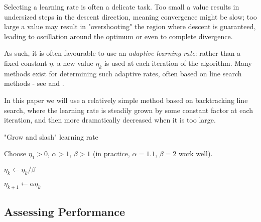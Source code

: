 \documentclass{article}[11pt]
\begin{document}
            Selecting a learning rate is often a delicate task. Too small a value results in undersized steps in the descent direction, meaning convergence might be slow; too large a value may result in "overshooting" the region where descent is guaranteed, leading to oscillation around the optimum or even to complete divergence.
            
            As such, it is often favourable to use an \textit{adaptive learning rate}: rather than a fixed constant $\eta$, a new value $\eta_k$ is used at each iteration of the algorithm. Many methods exist for determining such adaptive rates, often based on line search methods - see \cite{line_search} and \cite{adam}.
            
            In this paper we will use a relatively simple method based on backtracking line search, where the learning rate is steadily grown by some constant factor at each iteration, and then more dramatically decreased when it is too large.
            
            
            \begin{algorithm} \label{alg:grow_and_slash}
                
                \caption{"Grow and slash" learning rate}
                
                \begin{algorithmic}
                
                    \State Choose $\eta_1 > 0$, $\alpha > 1$, $\beta > 1$ (in practice, $\alpha = 1.1$, $\beta = 2$ work well).
                    
                            \State $\eta_k \gets \eta_k / \beta$
                        \EndWhile
                        
                        \State $\eta_{k+1} \gets \alpha \eta_k$
                    \EndFor
                    
                \end{algorithmic}
            
            \end{algorithm}
                    
                
            
            
            
    \subsection{Assessing Performance}
        
\end{document}
